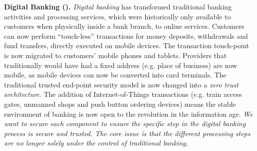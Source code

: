 \begin{Workpackage}{\thewpno}
\begin{Task}

\textbf{Digital Banking (\SOPRAshort{}).} \emph{Digital banking} has transformed
traditional banking activities and processing services, which were historically only available to customers when physically inside a bank branch, to online services. Customers can now perform ``touch-less'' transactions for
money deposits, withdrawals and fund transfers, directly executed on mobile devices. The transaction touch-point is now migrated to customers' mobile phones and tablets. Providers that traditionally would have had a fixed address (e.g. place of business) are now mobile, as  mobile devices can now be converted into card terminals. The traditional trusted end-point security model is now changed into a \emph{zero trust architecture}. The addition of Internet-of-Things transactions (e.g. train access gates, unmanned shops and push button ordering devices) means the stable environment of banking is now open to the revolution in the information age. \emph{We want to secure each component to ensure the specific step in the digital banking process is secure and trusted. The core issue is that the different processing steps are no longer solely under the control of traditional banking.}


\end{Task}
\end{Workpackage}
